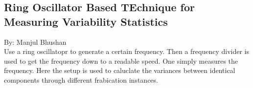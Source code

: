 \subsection*{Ring Oscillator Based TEchnique for Measuring Variability Statistics}
By: Manjul Bhushan\\

Use a ring oscillatopr to generate a certain frequency. Then a frequency divider is used to get the frequency down to a readable speed. One simply measures the frequency. Here the setup is used to caluclate the variances between identical components through different frabication instances.

